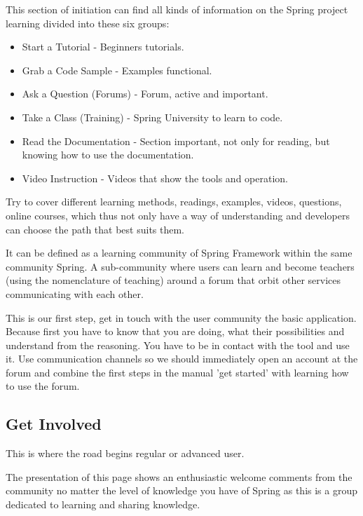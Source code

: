 \documentclass[11pt]{scrartcl}
\begin{document}
This section of initiation can find all kinds of information on the Spring project learning divided into these six groups:

\begin{itemize}
    \item Start a Tutorial - Beginners tutorials.
    \item Grab a Code Sample - Examples functional.
    \item Ask a Question (Forums) - Forum, active and important.
    \item Take a Class (Training) - Spring University to learn to code.
    \item Read the Documentation - Section important, not only for reading, but knowing how to use the documentation.
    \item Video Instruction - Videos that show the tools and operation.
\end{itemize}

\par Try to cover different learning methods, readings, examples, videos, questions, online courses, which thus not only have a way of understanding and developers can choose the path that best suits them.

\par It can be defined as a learning community of Spring Framework within the same community Spring. A sub-community where users can learn and become teachers (using the nomenclature of teaching) around a forum that orbit other services communicating with each other.

\par This is our first step, get in touch with the user community the basic application. Because first you have to know that you are doing, what their possibilities and understand from the reasoning. You have to be in contact with the tool and use it. Use communication channels so we should immediately open an account at the forum and combine the first steps in the manual 'get started' with learning how to use the forum.

\subsection{Get Involved}

\par This is where the road begins regular or advanced user.

\par The presentation of this page shows an enthusiastic welcome comments from the community no matter the level of knowledge you have of Spring as this is a group dedicated to learning and sharing knowledge.
\end{document}
